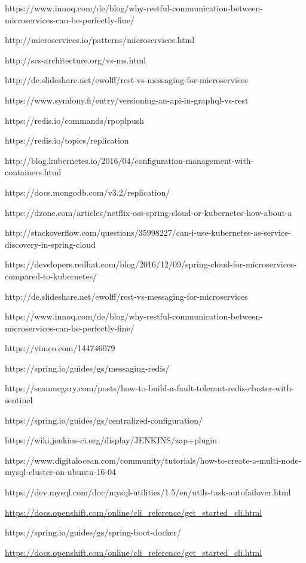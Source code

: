 https://www.innoq.com/de/blog/why-restful-communication-between-microservices-can-be-perfectly-fine/

http://microservices.io/patterns/microservices.html

http://scs-architecture.org/vs-ms.html

http://de.slideshare.net/ewolff/rest-vs-messaging-for-microservices

https://www.symfony.fi/entry/versioning-an-api-in-graphql-vs-rest

https://redis.io/commands/rpoplpush

https://redis.io/topics/replication

http://blog.kubernetes.io/2016/04/configuration-management-with-containers.html

https://docs.mongodb.com/v3.2/replication/

https://dzone.com/articles/netflix-oss-spring-cloud-or-kubernetes-how-about-a

http://stackoverflow.com/questions/35998227/can-i-use-kubernetes-as-service-discovery-in-spring-cloud

https://developers.redhat.com/blog/2016/12/09/spring-cloud-for-microservices-compared-to-kubernetes/

http://de.slideshare.net/ewolff/rest-vs-messaging-for-microservices

https://www.innoq.com/de/blog/why-restful-communication-between-microservices-can-be-perfectly-fine/

https://vimeo.com/144746079

https://spring.io/guides/gs/messaging-redis/

https://seanmcgary.com/posts/how-to-build-a-fault-tolerant-redis-cluster-with-sentinel

https://spring.io/guides/gs/centralized-configuration/

https://wiki.jenkins-ci.org/display/JENKINS/zap+plugin

https://www.digitalocean.com/community/tutorials/how-to-create-a-multi-node-mysql-cluster-on-ubuntu-16-04

https://dev.mysql.com/doc/mysql-utilities/1.5/en/utils-task-autofailover.html

\url{https://docs.openshift.com/online/cli_reference/get_started_cli.html}

https://spring.io/guides/gs/spring-boot-docker/

\url{https://docs.openshift.com/online/cli_reference/get_started_cli.html}

